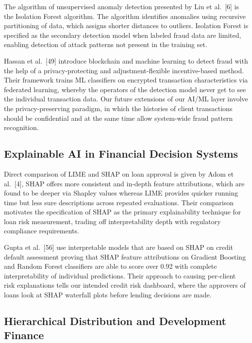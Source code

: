 \documentclass[12pt,a4paper]{report}
\begin{document}
The algorithm of unsupervised anomaly detection presented by Liu et al.~[6] is the Isolation Forest algorithm. The algorithm identifies anomalies using recursive partitioning of data, which assigns shorter distances to outliers. Isolation Forest is specified as the secondary detection model when labeled fraud data are limited, enabling detection of attack patterns not present in the training set.

Hassan et al.~[49] introduce blockchain and machine learning to detect fraud with the help of a privacy-protecting and adjustment-flexible incentive-based method. Their framework trains ML classifiers on encrypted transaction characteristics via federated learning, whereby the operators of the detection model never get to see the individual transaction data. Our future extensions of our AI/ML layer involve the privacy-preserving paradigm, in which the histories of client transactions should be confidential and at the same time allow system-wide fraud pattern recognition.

\subsection{Explainable AI in Financial Decision Systems}

Direct comparison of LIME and SHAP on loan approval is given by Adom et al.~[4], SHAP offers more consistent and in-depth feature attributions, which are found to be deeper via Shapley values whereas LIME provides quicker running time but less sure descriptions across repeated evaluations. Their comparison motivates the specification of SHAP as the primary explainability technique for loan risk measurement, trading off interpretability depth with regulatory compliance requirements.

Gupta et al.~[56] use interpretable models that are based on SHAP on credit default assessment proving that SHAP feature attributions on Gradient Boosting and Random Forest classifiers are able to score over 0.92 with complete interpretability of individual predictions. Their approach to causing per-client risk explanations tells our intended credit risk dashboard, where the approvers of loans look at SHAP waterfall plots before lending decisions are made.

\subsection{Hierarchical Distribution and Development Finance}
\end{document}
